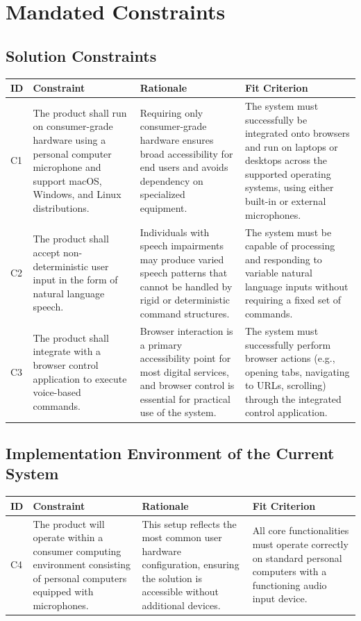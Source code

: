 \documentclass[11pt]{article}
\begin{document}
\section{Mandated Constraints}
\subsection{Solution Constraints}

\begin{tabularx}{\textwidth}{p{1cm}X X X}
\toprule
\textbf{ID} & \textbf{Constraint} & \textbf{Rationale} & \textbf{Fit Criterion} \\
\midrule
C1 & The product shall run on consumer-grade hardware using a personal computer microphone and support macOS, Windows, and Linux distributions. & Requiring only consumer-grade hardware ensures broad accessibility for end users and avoids dependency on specialized equipment. & The system must successfully be integrated onto browsers and run on laptops or desktops across the supported operating systems, using either built-in or external microphones. \\
\hline
C2 & The product shall accept non-deterministic user input in the form of natural language speech. & Individuals with speech impairments may produce varied speech patterns that cannot be handled by rigid or deterministic command structures. & The system must be capable of processing and responding to variable natural language inputs without requiring a fixed set of commands. \\
\hline
C3 & The product shall integrate with a browser control application to execute voice-based commands. & Browser interaction is a primary accessibility point for most digital services, and browser control is essential for practical use of the system. & The system must successfully perform browser actions (e.g., opening tabs, navigating to URLs, scrolling) through the integrated control application. \\
\bottomrule
\end{tabularx}


\subsection{Implementation Environment of the Current System}


\begin{tabularx}{\textwidth}{p{1cm}X X X}
\toprule
\textbf{ID} & \textbf{Constraint} & \textbf{Rationale} & \textbf{Fit Criterion} \\
\midrule
C4 & The product will operate within a consumer computing environment consisting of personal computers equipped with microphones. & This setup reflects the most common user hardware configuration, ensuring the solution is accessible without additional devices. & All core functionalities must operate correctly on standard personal computers with a functioning audio input device. \\
\bottomrule
\end{tabularx}
\end{document}
